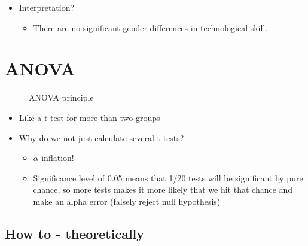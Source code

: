 \documentclass[
]{book}
\providecommand{\tightlist}{%
  \setlength{\itemsep}{0pt}\setlength{\parskip}{0pt}}
\begin{document}
\begin{itemize}
\tightlist
\item
  Interpretation?

  \begin{itemize}
  \tightlist
  \item
    There are no significant gender differences in technological skill.
  \end{itemize}
\end{itemize}

\section{ANOVA}\label{anova}

\begin{figure}
\centering

\caption{ANOVA principle}
\end{figure}

\begin{itemize}
\tightlist
\item
  Like a t-test for more than two groups
\item
  Why do we not just calculate several t-tests?

  \begin{itemize}
  \tightlist
  \item
    \(\alpha\) inflation!
  \item
    Significance level of 0.05 means that 1/20 tests will be significant by pure chance, so more tests makes it more likely that we hit that chance and make an alpha error (falsely reject null hypothesis)
  \end{itemize}
\end{itemize}

\subsection{How to - theoretically}\label{how-to---theoretically}
\end{document}
